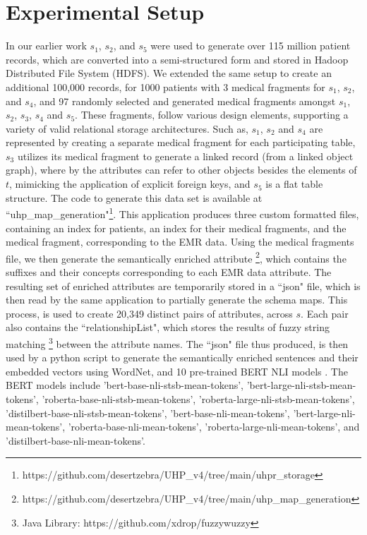 
\section*{Experimental Setup}
\label{experimentalSetup}
In our earlier work \cite{Satti2020} $s_1$, $s_2$, and $s_5$ were used to generate over 115 million patient records, which are converted into a semi-structured form and stored in Hadoop Distributed File System (HDFS). We extended the same setup to create an additional 100,000 records, for 1000 patients with 3 medical fragments for $s_1$, $s_2$, and $s_4$, and 97 randomly selected and generated medical fragments amongst $s_1$, $s_2$, $s_3$, $s_4$ and $s_5$. These fragments, follow various design elements, supporting a variety of valid relational storage architectures. Such as, $s_1$, $s_2$ and $s_4$ are represented by creating a separate medical fragment for each participating table, $s_3$ utilizes its medical fragment to generate a linked record (from a linked object graph), where by the attributes can refer to other objects besides the elements of $t$, mimicking the application of explicit foreign keys, and $s_5$ is a flat table structure. The code to generate this data set is available at ``uhp\_map\_generation"\footnote{https://github.com/desertzebra/UHP\_v4/tree/main/uhpr\_storage}. This application produces three custom formatted files, containing an index for patients, an index for their medical fragments, and the medical fragment, corresponding to the EMR data. Using the medical fragments file, we then generate the semantically enriched attribute \footnote{https://github.com/desertzebra/UHP\_v4/tree/main/uhp\_map\_generation}, which contains the suffixes and their concepts corresponding to each EMR data attribute. The resulting set of enriched attributes are temporarily stored in a ``json" file, which is then read by the same application to partially generate the schema maps. This process, is used to create 20,349 distinct pairs of attributes, across $s$. Each pair also contains the ``relationshipList", which stores the results of fuzzy string matching\cite{FuzzyWuzzy} \footnote{Java Library: https://github.com/xdrop/fuzzywuzzy} between the attribute names. 
The ``json" file thus produced, is then used by a python script to generate the semantically enriched sentences and their embedded vectors using WordNet, and 10 pre-trained BERT NLI models \cite{reimers-2019-sentence-bert}. The BERT models include 'bert-base-nli-stsb-mean-tokens', 'bert-large-nli-stsb-mean-tokens', 'roberta-base-nli-stsb-mean-tokens', 'roberta-large-nli-stsb-mean-tokens', 'distilbert-base-nli-stsb-mean-tokens', 'bert-base-nli-mean-tokens', 'bert-large-nli-mean-tokens', 'roberta-base-nli-mean-tokens', 'roberta-large-nli-mean-tokens', and 'distilbert-base-nli-mean-tokens'. 
